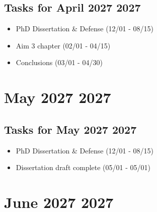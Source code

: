 \documentclass[landscape,a4paper]{article}
\begin{document}
\vspace{1cm}

\subsection*{Tasks for April 2027 2027}
\begin{itemize}
\item PhD Dissertation \& Defense (12/01 - 08/15)
\item Aim 3 chapter (02/01 - 04/15)
\item Conclusions (03/01 - 04/30)
\end{itemize}
\newpage

\section*{May 2027 2027}

\begin{center}
\begin{tikzpicture}[scale=0.9]
\end{tikzpicture}
\end{center}

\vspace{1cm}

\subsection*{Tasks for May 2027 2027}
\begin{itemize}
\item PhD Dissertation \& Defense (12/01 - 08/15)
\item Dissertation draft complete (05/01 - 05/01)
\end{itemize}
\newpage

\section*{June 2027 2027}

\begin{center}
\begin{tikzpicture}[scale=0.9]
\end{tikzpicture}
\end{center}

\vspace{1cm}
\end{document}
